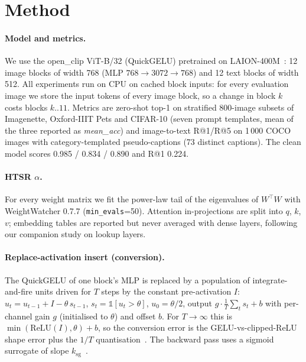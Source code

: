 \section{Method}
\label{sec:method}

\paragraph{Model and metrics.} We use the open\_clip ViT-B/32 (QuickGELU) pretrained on LAION-400M~\cite{cherti2023openclip,radford2021clip}: 12 image blocks of width 768 (MLP $768{\to}3072{\to}768$) and 12 text blocks of width 512. All experiments run on CPU on cached block inputs: for every evaluation image we store the input tokens of every image block, so a change in block $k$ costs blocks $k..11$. Metrics are zero-shot top-1 on stratified 800-image subsets of Imagenette, Oxford-IIIT Pets and CIFAR-10 (seven prompt templates, mean of the three reported as \emph{mean\_acc}) and image-to-text R@1/R@5 on 1\,000 COCO images with category-templated pseudo-captions (73 distinct captions). The clean model scores 0.985 / 0.834 / 0.890 and R@1 0.224.

\paragraph{HTSR $\alpha$.} For every weight matrix we fit the power-law tail of the eigenvalues of $W^\top W$ with WeightWatcher 0.7.7 (\texttt{min\_evals}=50). Attention in-projections are split into $q$, $k$, $v$; embedding tables are reported but never averaged with dense layers, following our companion study on lookup layers.

\paragraph{Replace-activation insert (conversion).} The QuickGELU of one block's MLP is replaced by a population of integrate-and-fire units driven for $T$ steps by the constant pre-activation $I$: $u_t = u_{t-1} + I - \theta\, s_{t-1}$, $s_t = \mathbb{1}[u_t > \theta]$, $u_0 = \theta/2$, output $g \cdot \tfrac{1}{T}\sum_t s_t + b$ with per-channel gain $g$ (initialised to $\theta$) and offset $b$. For $T \to \infty$ this is $\min(\mathrm{ReLU}(I), \theta) + b$, so the conversion error is the GELU-vs-clipped-ReLU shape error plus the $1/T$ quantisation~\cite{rueckauer2017conversion}. The backward pass uses a sigmoid surrogate of slope $k_{\mathrm{sg}}$~\cite{neftci2019surrogate}.

